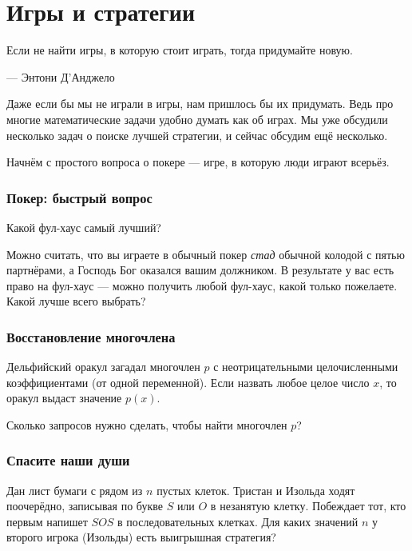\chapter{Игры и стратегии}


\setlength{\epigraphwidth}{.63\textwidth}
\epigraph{Если не найти игры, в которую стоит играть, тогда придумайте новую. 
}{— Энтони Д'Анджело}%

Даже если бы мы не играли в игры, нам пришлось бы их придумать.
Ведь про многие математические задачи удобно думать как об играх.
Мы уже обсудили несколько задач о поиске лучшей стратегии, и сейчас обсудим ещё несколько.

Начнём с простого вопроса о покере --- игре, в которую люди играют всерьёз.

\subsection*{Покер: быстрый вопрос}

Какой фул-хаус самый лучший?

Можно считать, что вы играете в обычный покер \emph{стад} обычной колодой с пятью партнёрами, а Господь Бог оказался вашим должником.
В результате у вас есть право на фул-хаус --- можно получить любой фул-хаус, какой только пожелаете.
Какой лучше всего выбрать?

\subsection*{Восстановление многочлена}

Дельфийский оракул загадал многочлен $p$ с неотрицательными целочисленными коэффициентами (от одной переменной).
Если назвать любое целое число $x$, то оракул выдаст значение $p(x)$.

Сколько запросов нужно сделать, чтобы найти многочлен $p$?

\subsection*{Спасите наши души}

Дан лист бумаги с рядом из $n$ пустых клеток.
Тристан и Изольда ходят поочерёдно, записывая по букве $S$ или $O$ в незанятую клетку.
Побеждает тот, кто первым напишет $SOS$ в последовательных клетках.
Для каких значений $n$ у второго игрока (Изольды) есть выигрышная стратегия?


